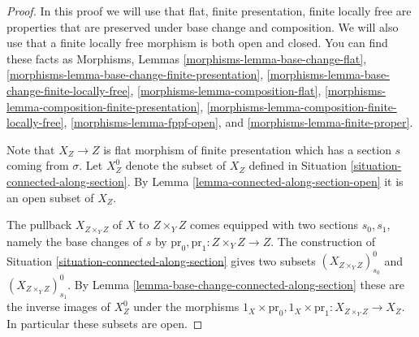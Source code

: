 \begin{proof}
In this proof we will use that flat, finite presentation, finite locally
free are properties that are preserved under base change and composition.
We will also use that a finite locally free morphism is both open and
closed. You can find these facts as
Morphisms, Lemmas
\ref{morphisms-lemma-base-change-flat},
\ref{morphisms-lemma-base-change-finite-presentation},
\ref{morphisms-lemma-base-change-finite-locally-free},
\ref{morphisms-lemma-composition-flat},
\ref{morphisms-lemma-composition-finite-presentation},
\ref{morphisms-lemma-composition-finite-locally-free},
\ref{morphisms-lemma-fppf-open}, and
\ref{morphisms-lemma-finite-proper}.

\medskip\noindent
Note that $X_Z \to Z$ is flat morphism of finite presentation
which has a section $s$ coming from $\sigma$. Let $X_Z^0$ denote
the subset of $X_Z$ defined in
Situation \ref{situation-connected-along-section}.
By
Lemma \ref{lemma-connected-along-section-open}
it is an open subset of $X_Z$.

\medskip\noindent
The pullback $X_{Z \times_Y Z}$ of $X$ to $Z \times_Y Z$ comes equipped
with two sections $s_0, s_1$, namely the base changes of $s$ by
$\text{pr}_0, \text{pr}_1 : Z \times_Y Z \to Z$. The construction of
Situation \ref{situation-connected-along-section}
gives two subsets $(X_{Z \times_Y Z})_{s_0}^0$ and
$(X_{Z \times_Y Z})_{s_1}^0$. By
Lemma \ref{lemma-base-change-connected-along-section}
these are the inverse images of $X_Z^0$ under the morphisms
$1_X \times \text{pr}_0, 1_X \times \text{pr}_1 : X_{Z \times_Y Z} \to X_Z$.
In particular these subsets are open.


\end{proof}
